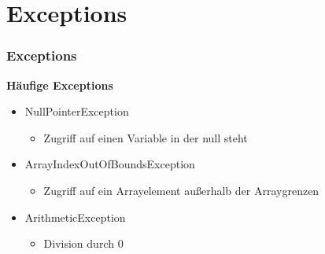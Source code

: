 \documentclass[final]{beamer}
\begin{document}
\section{Exceptions}
\begin{frame}
	\frametitle{Exceptions}
	\textbf{Häufige Exceptions}
	\begin{itemize}
		\item{NullPointerException}
			\begin{itemize}
				\item{Zugriff auf einen Variable in der \color{blue}null \color{black} steht}
			\end{itemize}
		\item{ArrayIndexOutOfBoundsException}
			\begin{itemize}
				\item{Zugriff auf ein Arrayelement außerhalb der Arraygrenzen}
			\end{itemize}
		\item{ArithmeticException}
			\begin{itemize}
				\item{Division durch 0}
			\end{itemize}
	\end{itemize}
\end{frame}
\end{document}

